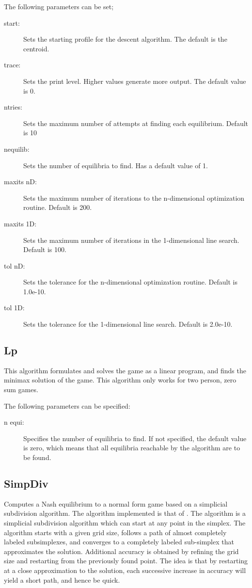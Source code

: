 The following parameters can be set;

\begin{description}
\item[start:] Sets the starting profile for the descent algorithm.  The
default is the centroid.
\item[trace:] Sets the print level.  Higher values generate more output.
The default value is 0.
\item[ntries:] Sets the maximum number of attempts at finding each
equilibrium. Default is 10
\item[nequilib:] Sets the number of equilibria to find.  Has a default
value of 1.  
\item[maxits nD:] Sets the maximum number of iterations to the
n-dimensional optimization routine.  Default is 200.
\item[maxits 1D:] Sets the maximum number of iterations in the
1-dimensional line search.  Default is 100.
\item[tol nD:] Sets the tolerance for the n-dimensional optimization
routine.  Default is 1.0e-10.
\item[tol 1D:] Sets the tolerance for the 1-dimensional line search.
Default is 2.0e-10.
\end{description}

\subsection{Lp}\label{Lp}
This algorithm formulates and solves the game as a linear program, and finds the 
minimax solution of the game.  This algorithm only works for two person, zero sum 
games.    

The following parameters can be specified:

\begin{description}
\item[n equi:] Specifies the number of equilibria to find.  If not specified,
the default value is zero, which means that all equilibria reachable by
the algorithm are to be found.
\end{description}

\subsection{SimpDiv}\label{SimpDiv}
Computes a Nash equilibrium to a normal form game based
on a simplicial subdivision algorithm.  The algorithm implemented is
that of \cite{VTH:1987}.  The algorithm is a simplicial subdivision
algorithm which can start at any point in the simplex.  The algorithm
starts with a given grid size, follows a path of almost completely labeled
subsimplexes, and converges to a completely labeled sub-simplex that
approximates the solution.  Additional accuracy is obtained by refining
the grid size and restarting from the previously found point.  The idea is
that by restarting at a close approximation to the solution, each
successive increase in accuracy will yield a short path, and hence be
quick.

